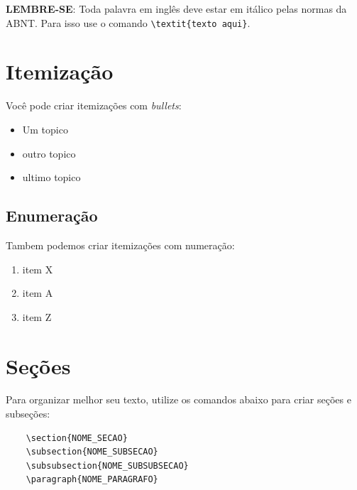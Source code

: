 \textbf{LEMBRE-SE}: Toda palavra em inglês deve estar em itálico pelas normas da ABNT. Para isso use o comando \verb|\textit{texto aqui}|.

\section{Itemização}

Você pode criar itemizações com \textit{bullets}:

\begin{itemize}
    \item Um topico
    \item outro topico
    \item ultimo topico
\end{itemize}

\subsection{Enumeração}

Tambem podemos criar itemizações com numeração:

\begin{enumerate}    
    \item item X
    \item item A
    \item item Z       
\end{enumerate}

\section{Seções}

Para organizar melhor seu texto, utilize os comandos abaixo para criar seções e subseções:

\begin{verbatim}
    \section{NOME_SECAO}
    \subsection{NOME_SUBSECAO}
    \subsubsection{NOME_SUBSUBSECAO}
    \paragraph{NOME_PARAGRAFO}
\end{verbatim}

